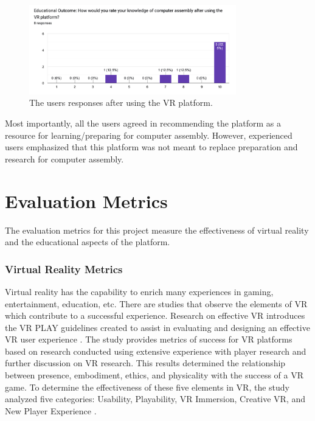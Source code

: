 \documentclass[10pt,twocolumn]{article}
\begin{document}
\begin{figure}
    \centering
    \includegraphics[width=9cm]{images/UserExperience4.png}
    \caption{The users responses after using the VR platform.}
\end{figure}

\par Most importantly, all the users agreed in recommending the platform as a resource for learning/preparing for computer assembly. However, experienced users emphasized that this platform was not meant to replace preparation and research for computer assembly. 

\section{Evaluation Metrics}

\par The evaluation metrics for this project measure the effectiveness of virtual reality and the educational aspects of the platform. 

\subsubsection{Virtual Reality Metrics}

\par Virtual reality has the capability to enrich many experiences in gaming, entertainment, education, etc. There are studies that observe the elements of VR which contribute to a successful experience. Research on effective VR introduces the VR PLAY guidelines created to assist in evaluating and designing an effective VR user experience \cite{Desurvire2018DesignUserExperience}. The study provides metrics of success for VR platforms based on research conducted using extensive experience with player research and further discussion on VR research. 
This results determined the relationship between presence, embodiment, ethics, and physicality with the success of a VR game. To determine the effectiveness of these five elements in VR, the study analyzed five categories: Usability, Playability, VR Immersion, Creative VR, and New Player Experience \cite{Desurvire2018DesignUserExperience}. 
\end{document}
